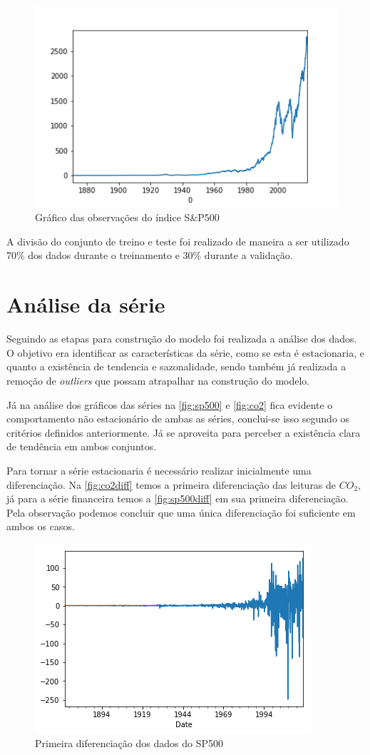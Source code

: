\documentclass[
    12pt,
    oneside,
    a4paper,
    english,
    brazil
]{abntex2}
\begin{document}
\begin{figure}[ht]
    \centering
    \caption{Gráfico das observações do índice S\&P500}\label{fig:sp500}
    \includegraphics[width=.5\linewidth]{images/sp500.png}
\end{figure}

A divisão do conjunto de treino e teste foi realizado de maneira a ser
utilizado 70\% dos dados durante o treinamento e 30\% durante a validação.

\section{Análise da série}

Seguindo as etapas para construção do modelo foi realizada a análise dos dados.
O  objetivo  era identificar  as  características  da  série,  como se  esta  é
estacionaria, e quanto  a existência de tendencia e  sazonalidade, sendo também
já realizada a remoção de \textit{outliers} que possam atrapalhar na construção
do modelo.

Já   na   análise   dos   gráficos  das   séries   na   \autoref{fig:sp500}   e
\autoref{fig:co2} fica  evidente o comportamento  não estacionário de  ambas as
séries, conclui-se  isso segundo  os critérios  definidos anteriormente.  Já se
aproveita para perceber a existência clara de tendência em ambos conjuntos.

Para  tornar  a  série  estacionaria é  necessário  realizar  inicialmente  uma
diferenciação.  Na \autoref{fig:co2diff}  temos  a  primeira diferenciação  das
leituras de $CO_2$, já para  a série financeira temos a \autoref{fig:sp500diff}
em sua primeira  diferenciação. Pela observação podemos concluir  que uma única
diferenciação foi suficiente em ambos os casos.

\begin{figure}[ht]
    \centering
    \caption{Primeira diferenciação dos dados do SP500}\label{fig:sp500diff}
    \includegraphics[width=.5\linewidth]{images/sp500diff.png}
\end{figure}
\end{document}
